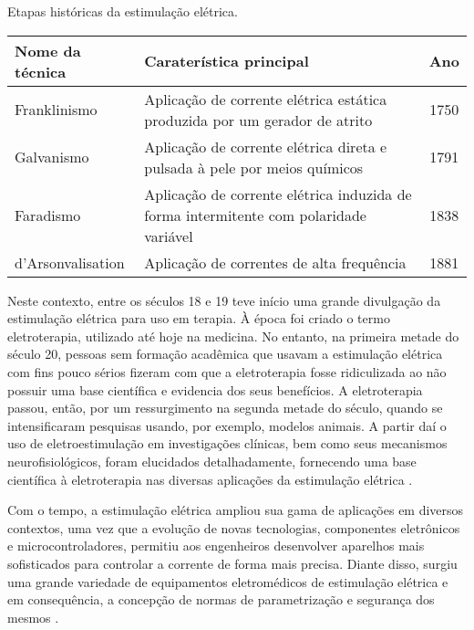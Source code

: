 \smallskip

\begin{quadro}
    \caption{Etapas históricas da estimulação elétrica.}
    \centering
    \begin{tabular}{|>{\centering\arraybackslash} m{2.5cm}|p{8cm}|c|}
        \hline
        \rowcolor{lightgray} \textbf{Nome da técnica} &\textbf{Caraterística principal} & \textbf{Ano} \\
        \hline
        Franklinismo
        & Aplicação de corrente elétrica estática produzida por um gerador de atrito & 1750 \\
        \hline
        Galvanismo & Aplicação de corrente elétrica direta e pulsada à pele por meios químicos  & 1791  \\
        \hline
        Faradismo & Aplicação de corrente elétrica induzida de forma intermitente com polaridade variável & 1838  \\
        \hline
        d'Arsonvalisation  & Aplicação de correntes de alta frequência  & 1881 \\
        \hline     
    \end{tabular}
    \label{q1}
\end{quadro}

Neste contexto, entre os séculos 18 e 19 teve início uma grande divulgação da estimulação elétrica para uso em terapia. À época foi criado o termo eletroterapia, utilizado até hoje na medicina. No entanto, na primeira metade do século 20, pessoas sem formação acadêmica que usavam a estimulação elétrica com fins pouco sérios fizeram com que a eletroterapia fosse ridiculizada ao não possuir uma base científica e evidencia dos seus benefícios. A eletroterapia passou, então, por um ressurgimento na segunda metade do século, quando se intensificaram pesquisas usando, por exemplo, modelos animais. A partir daí o uso de eletroestimulação em investigações clínicas, bem como seus mecanismos neurofisiológicos, foram elucidados detalhadamente, fornecendo uma base científica à eletroterapia nas diversas aplicações da estimulação elétrica \cite{Heidland2013NeuromuscularWaisting}.

Com o tempo, a estimulação elétrica ampliou sua gama de aplicações em diversos contextos, uma vez que a evolução de novas tecnologias, componentes eletrônicos e microcontroladores, permitiu aos engenheiros desenvolver aparelhos mais sofisticados para controlar a corrente de forma mais precisa. Diante disso, surgiu uma grande variedade de equipamentos eletromédicos de estimulação elétrica e em consequência, a concepção de normas de parametrização e segurança dos mesmos \cite{Sanches2013SistemaParaplegicos}.

